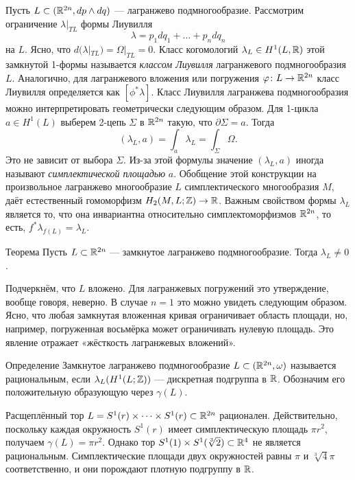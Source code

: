 Пусть $L \subset (\mathbb{R}^{2n}, dp \wedge dq)$ --- лагранжево подмногообразие.
Рассмотрим ограничение $\lambda|_{TL}$ формы Лиувилля 
\[\lambda = p_1 dq_1+\dots+ p_n dq_n\]
на $L$.
Ясно, что $d (\lambda|_{TL}) = \Omega|_{TL} = 0$.
Класс когомологий $\lambda_L \in H^1 (L, \mathbb{R})$ этой замкнутой 1-формы называется \emph{классом Лиувилля} лагранжевого подмногообразия $L$.
Аналогично, для лагранжевого вложения или погружения $\varphi\colon L \to \mathbb{R}^{2n}$ класс Лиувилля определяется как $[\phi^\ast \lambda]$.
Класс Лиувилля лагранжева подмногообразия можно интерпретировать геометрически следующим образом.
Для 1-цикла $a\in H^1 (L)$ выберем 2-цепь $\Sigma$ в $\mathbb{R}^{2n}$ такую, что $\partial\Sigma = a$.
Тогда
\[(\lambda_L, a) = \int_a\lambda_L = \int_\Sigma\Omega.\]
Это  не зависит от выбора $\Sigma$.
Из-за этой формулы значение $(\lambda_L, a)$ иногда называют \emph{симплектической площадью} $a$.
Обобщение этой конструкции на произвольное лагранжево многообразие $L$ симплектического многообразия $M$, даёт естественный гомоморфизм $H_2 (M, L; \mathbb{Z}) \to \mathbb{R}$.
Важным свойством формы $\lambda_L$ является то, что она инвариантна относительно симплектоморфизмов $\mathbb{R}^{2n}$,
то есть,
$f^\ast \lambda_{f (L)} = \lambda_L$.

\begin{thm}[(\cite{G1})]{Теорема}\label{3.2.A}
Пусть $L \subset \mathbb{R}^{2n}$ --- замкнутое лагранжево подмногообразие.
Тогда $\lambda_L \ne 0$.
\end{thm}

Подчеркнём, что $L$ вложено.
Для лагранжевых погружений это утверждение, вообще говоря, неверно.
В случае $n = 1$ это можно увидеть следующим образом.
Ясно, что любая замкнутая вложенная кривая ограничивает область  площади, но, например, погруженная восьмёрка может ограничивать нулевую площадь.
Это явление отражает «жёсткость лагранжевых вложений».

\begin{thm*}{Определение}
Замкнутое лагранжево подмногообразие $L \subset (\mathbb{R}^{2n}, \omega)$ называется рациональным, если $\lambda_L (H^1 (L; \mathbb{Z}))$ --- дискретная подгруппа в $\mathbb{R}$.
Обозначим его положительную образующую через $\gamma (L)$.
\end{thm*}

Расщеплённый тор $L = S^1 (r) \times\dots\times S^1 (r) \subset \mathbb{R}^{2n}$ рационален.
Действительно, поскольку каждая окружность $S^1 (r)$ имеет симплектическую площадь $\pi r^2$, получаем $\gamma (L) = \pi r^2$.
Однако тор $S^1(1)\times S^1(\sqrt[3]{2}) \subset \mathbb{R}^4$ не является рациональным.
Симплектические площади двух окружностей равны $\pi$  и $\sqrt[3]{4}\pi$ соответственно, и они порождают плотную подгруппу в $\mathbb{R}$.

